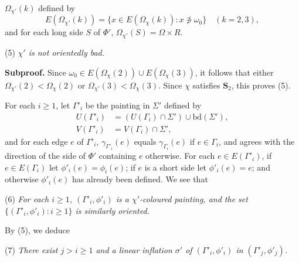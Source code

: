 \noindent $\Omega_{\chi'}(k)$ defined by
\begin{equation*}
E(\Omega_{\chi'}(k)) = \{x \in E(\Omega_{\chi}(k)) : x \not\ni \omega_0\} \quad (k = 2, 3),
\end{equation*}
and for each long side $S$ of $\Phi'$, $\Omega_{\chi'}(S) = \Omega \times R$.

\hspace*{12pt}(5) \textit{$\chi'$ is not orientedly bad.}

\textbf{Subproof.} Since $\omega_0 \in E(\Omega_{\chi}(2)) \cup E(\Omega_{\chi}(3))$, it follows that either $\Omega_{\chi'}(2) < \Omega_{\chi}(2)$ or $\Omega_{\chi'}(3) < \Omega_{\chi}(3)$. Since $\chi$ satisfies $\mathbf{S}_2$, this proves (5).

For each $i \ge 1$, let $\Gamma'_i$ be the painting in $\Sigma'$ defined by
\begin{align*}
U(\Gamma'_i) &= (U(\Gamma_i) \cap \Sigma') \cup \text{bd}(\Sigma'), \\
V(\Gamma'_i) &= V(\Gamma_i) \cap \Sigma',
\end{align*}
and for each edge $e$ of $\Gamma'_i$, $\gamma_{\Gamma'_i}(e)$ equals $\gamma_{\Gamma_i}(e)$ if $e \in \Gamma_i$, and  agrees with the direction of the  side of $\Phi'$ containing $e$ otherwise. For each $e \in E(\Gamma'_i)$, if $e \in E(\Gamma_i)$ let $\phi'_i(e) = \phi_i(e)$; if $e$ is a short side let $\phi'_i(e) = e$; and otherwise $\phi'_i(e)$ has already been defined. We see that

\hspace*{12pt}(6) \textit{For each $i \ge 1$, $(\Gamma'_i, \phi'_i)$ is a $\chi'$-coloured painting, and the set $\{(\Gamma'_i, \phi'_i) : i \ge 1\}$ is similarly oriented.}

By (5), we deduce

\hspace*{12pt}(7) \textit{There exist $j > i \ge 1$ and a linear inflation $\sigma'$ of $(\Gamma'_i, \phi'_i)$ in $(\Gamma'_j, \phi'_j)$.}

